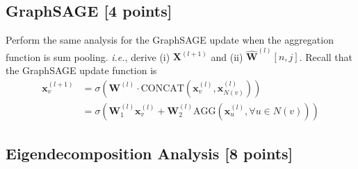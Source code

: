 \subsection{GraphSAGE [4 points]}
Perform the same analysis for the GraphSAGE update when the aggregation function is sum pooling. \emph{i.e.}, derive (i)  $\mathbf{X}^{(l+1)}$ and (ii) $\hat{\mathbf{W}}^{(l)}[n,j]$. Recall that the GraphSAGE update function is
\begin{align*}
    \mathbf{x}_v^{(l+1)} &= \sigma \left(\mathbf{W}^{(l)} \cdot \mathrm{CONCAT}\left(\mathbf{x}_v^{(l)}, \mathbf{x}_{N(v)}^{(l)}\right) \right) \\
    &= \sigma \left(\mathbf{W}_1^{(l)} \mathbf{x}_v^{(l)} + \mathbf{W}_2^{(l)} \mathrm{AGG}\left(\mathbf{x}_u^{(l)}, \forall u \in N(v)\right) \right)
\end{align*}


\subsection{Eigendecomposition Analysis [8 points]}

